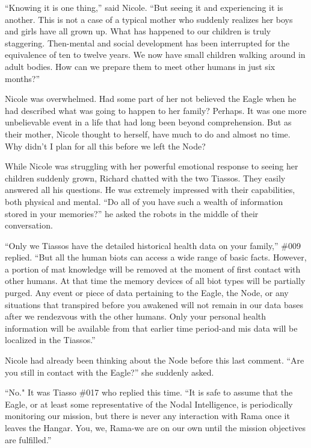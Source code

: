 \documentclass[]{article}
\begin{document}
{“Knowing it is one thing,” said Nicole.  “But seeing it and experiencing it is another.  This is not a case of a typical mother who suddenly realizes her boys and girls have all grown up.  What has happened to our children is truly staggering.  Then-mental and social development has been interrupted for the equivalence of ten to twelve years.  We now have small children walking around in adult bodies.  How can we prepare them to meet other humans in just six months?”

Nicole was overwhelmed.  Had some part of her not believed the Eagle when he had described what was going to happen to her family? Perhaps.  It was one more unbelievable event in a life that had long been beyond comprehension.  But as their mother, Nicole thought to herself, have much to do and almost no time.  Why didn’t I plan for all this before we left the Node?

While Nicole was struggling with her powerful emotional response to seeing her children suddenly grown, Richard chatted with the two Tiassos.  They easily answered all his questions.  He was extremely impressed with their capabilities, both physical and mental.  “Do all of you have such a wealth of information stored in your memories?” he asked the robots in the middle of their conversation.

“Only we Tiassos have the detailed historical health data on your family,” \#009 replied.  “But all the human biots can access a wide range of basic facts.  However, a portion of mat knowledge will be removed at the moment of first contact with other humans.  At that time the memory devices of all biot types will be partially purged.  Any event or piece of data pertaining to the Eagle, the Node, or any situations that transpired before you awakened will not remain in our data bases after we rendezvous with the other humans.  Only your personal health information will be available from that earlier time period-and mis data will be localized in the Tiassos.”

Nicole had already been thinking about the Node before this last comment.  “Are you still in contact with the Eagle?” she suddenly asked.

“No."  It was Tiasso \#017 who replied this time.  “It is safe to assume that the Eagle, or at least some representative of the Nodal Intelligence, is periodically monitoring our mission, but there is never any interaction with Rama once it leaves the Hangar.  You, we, Rama-we are on our own until the mission objectives are fulfilled.”

}
\end{document}
